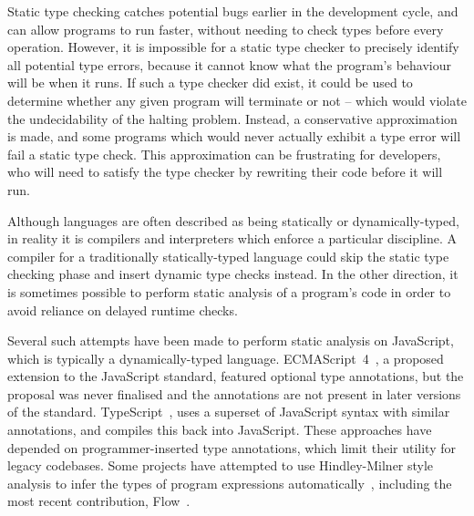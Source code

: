 \documentclass[12pt,a4paper,twoside,openright]{report}
\theoremstyle{definition}
\theoremstyle{dotless}
\begin{document}
Static type checking catches potential bugs earlier in the development cycle,
and can allow programs to run faster, without needing to check types before
every operation. However, it is impossible for a static type checker to
precisely identify all potential type errors, because it cannot know what the
program's behaviour will be when it runs. If such a type checker did exist, it
could be used to determine whether any given program will terminate or not --
which would violate the undecidability of the halting problem. Instead, a
conservative approximation is made, and some programs which would never
actually exhibit a type error will fail a static type check. This approximation
can be frustrating for developers, who will need to satisfy the type checker by
rewriting their code before it will run.

Although languages are often described as being statically or
dynamically-typed, in reality it is compilers and interpreters which enforce a
particular discipline. A compiler for a traditionally statically-typed language
could skip the static type checking phase and insert dynamic type checks
instead. In the other direction, it is sometimes possible to perform static
analysis of a program's code in order to avoid reliance on delayed runtime
checks.

Several such attempts have been made to perform static analysis on JavaScript,
which is typically a dynamically-typed language. ECMAScript~4~\cite{es4},
a proposed extension to the JavaScript standard, featured optional type
annotations, but the proposal was never finalised and the annotations are not
present in later versions of the standard. TypeScript~\cite{ts}, uses a
superset of JavaScript syntax with similar annotations, and compiles this back
into JavaScript. These approaches have depended on programmer-inserted type
annotations, which limit their utility for legacy codebases. Some projects
have attempted to use Hindley-Milner style analysis to infer the types of
program expressions automatically~\cite{anderson06, tajs, guha}, including the most
recent contribution, Flow~\cite{flow}. 
\end{document}
